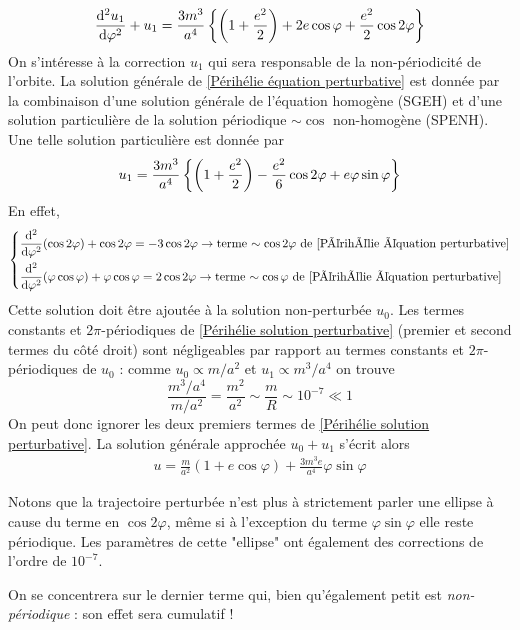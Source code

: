 \begin{align}
    \label{Périhélie équation perturbative}
    \frac{\mathrm{d}^2 u_1}{\mathrm{d} \varphi^2} + u_1  = \frac{3m^3}{a^4} \left\{ \left( 1+ \frac{e^2}{2} \right) + 2e \cos\varphi + \frac{e^2}{2} \cos 2\varphi \right\}
\end{align}
On s'intéresse à la correction $u_1$ qui sera responsable de la non-périodicité de l'orbite. La solution générale de \ref{Périhélie équation perturbative} est donnée par la combinaison d'une solution générale de l'équation homogène (SGEH) et d'une solution particulière de la solution périodique $\sim \cos$ non-homogène (SPENH). Une telle solution particulière est donnée par
\begin{equation}
    \label{Périhélie solution perturbative}
    u_1 = \frac{3m^3}{a^4} \left\{ \left( 1 + \frac{e^2}{2} \right) - \frac{e^2}{6} \cos 2 \varphi + e \varphi \sin \varphi \right\}
\end{equation}
En effet,
\begin{align}
    \begin{dcases}
        \frac{\mathrm{d}^2}{\mathrm{d}\varphi^2} (\cos 2 \varphi) + \cos 2\varphi = -3 \cos 2 \varphi \to \text{terme $\sim \cos 2 \varphi$ de \ref{Périhélie équation perturbative}}\\
        \frac{\mathrm{d}^2}{\mathrm{d}\varphi^2} (\varphi \cos \varphi) + \varphi\cos \varphi = 2 \cos 2 \varphi \to \text{terme $\sim \cos \varphi$ de \ref{Périhélie équation perturbative}}\\
    \end{dcases}
\end{align}
Cette solution doit être ajoutée à la solution non-perturbée $u_0$. Les termes constants et $2\pi$-périodiques de \ref{Périhélie solution perturbative} (premier et second termes du côté droit) sont négligeables par rapport au termes constants et $2\pi$-périodiques de $u_0$ : comme $u_0 \propto m/a^2$ et $u_1 \propto m^3/a^4$ on trouve
\begin{equation}
    \frac{m^3/a^4}{m/a^2} = \frac{m^2}{a^2} \sim \frac{m}{R} \sim 10^{-7} \ll 1
\end{equation}
On peut donc ignorer les deux premiers termes de \ref{Périhélie solution perturbative}. La solution générale approchée $u_0+u_1$ s'écrit alors
\begin{align}
    \label{Périhélie solution générale}
    \boxed{u = \frac{m}{a^2} (1+ e\cos \varphi ) + \frac{3m^3e}{a^4}\varphi \sin \varphi}
\end{align}
\begin{rmk}
    Notons que la trajectoire perturbée n'est plus à strictement parler une ellipse à cause du terme en $\cos 2 \varphi$, même si à l'exception du terme $\varphi \sin\varphi$ elle reste périodique. Les paramètres de cette "ellipse" ont également des corrections de l'ordre de $10^{-7}$.
\end{rmk}
On se concentrera sur le dernier terme qui, bien qu'également petit est \emph{non-périodique} : son effet sera cumulatif !
